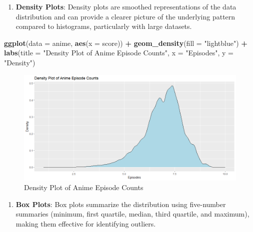 \documentclass[
]{book}
\newenvironment{Shaded}{\begin{snugshade}}{\end{snugshade}}
\newcommand{\AttributeTok}[1]{\textcolor[rgb]{0.13,0.29,0.53}{#1}}
\newcommand{\FunctionTok}[1]{\textcolor[rgb]{0.13,0.29,0.53}{\textbf{#1}}}
\newcommand{\NormalTok}[1]{#1}
\newcommand{\SpecialCharTok}[1]{\textcolor[rgb]{0.81,0.36,0.00}{\textbf{#1}}}
\newcommand{\StringTok}[1]{\textcolor[rgb]{0.31,0.60,0.02}{#1}}
\providecommand{\tightlist}{%
  \setlength{\itemsep}{0pt}\setlength{\parskip}{0pt}}
\begin{document}
\begin{enumerate}
\def\labelenumi{\arabic{enumi}.}
\setcounter{enumi}{1}
\tightlist
\item
  \textbf{Density Plots}: Density plots are smoothed representations of the data distribution and can provide a clearer picture of the underlying pattern compared to histograms, particularly with large datasets.
\end{enumerate}

\begin{Shaded}
\begin{Highlighting}[]
\FunctionTok{ggplot}\NormalTok{(}\AttributeTok{data =}\NormalTok{ anime, }\FunctionTok{aes}\NormalTok{(}\AttributeTok{x =}\NormalTok{ score)) }\SpecialCharTok{+}
  \FunctionTok{geom\_density}\NormalTok{(}\AttributeTok{fill =} \StringTok{"lightblue"}\NormalTok{) }\SpecialCharTok{+}
  \FunctionTok{labs}\NormalTok{(}\AttributeTok{title =} \StringTok{"Density Plot of Anime Episode Counts"}\NormalTok{, }\AttributeTok{x =} \StringTok{"Episodes"}\NormalTok{, }\AttributeTok{y =} \StringTok{"Density"}\NormalTok{)}
\end{Highlighting}
\end{Shaded}

\begin{figure}
\centering
\includegraphics[width=1\textwidth,height=\textheight]{images/density_plot.png}
\caption{Density Plot of Anime Episode Counts}
\end{figure}

\begin{enumerate}
\def\labelenumi{\arabic{enumi}.}
\setcounter{enumi}{2}
\tightlist
\item
  \textbf{Box Plots}: Box plots summarize the distribution using five-number summaries (minimum, first quartile, median, third quartile, and maximum), making them effective for identifying outliers.
\end{enumerate}
\end{document}
